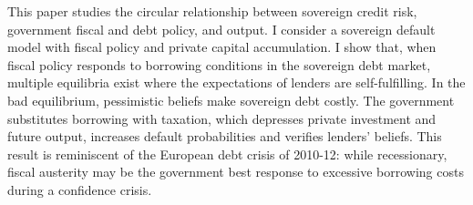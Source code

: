 This paper studies the circular relationship between sovereign credit risk, government fiscal and debt policy, and output. I consider a sovereign default model with fiscal policy and private capital accumulation. I show that, when fiscal policy responds to borrowing conditions in the sovereign debt market, multiple equilibria exist where the expectations of lenders are self-fulfilling. In the bad equilibrium, pessimistic beliefs make sovereign debt costly. The government substitutes borrowing with taxation, which depresses private investment and future output, increases default probabilities and verifies lenders' beliefs. This result is reminiscent of the European debt crisis of 2010-12: while recessionary, fiscal austerity may be the government best response to excessive borrowing costs during a confidence crisis. 